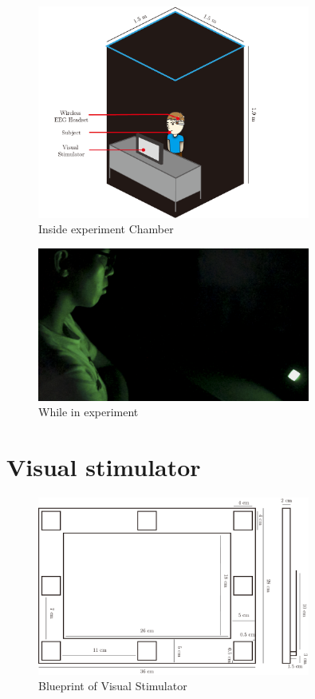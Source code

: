\begin{figure}[ht]
	\centering
	\includegraphics[width=0.8\textwidth]{chapter6/dark_wire_inside.pdf}
	\caption{Inside experiment Chamber}
\end{figure}

\begin{figure}[ht]
	\centering
	\includegraphics[width=0.8\textwidth]{chapter6/experi.jpg}
	\caption{While in experiment}
\end{figure}

\section{Visual stimulator}


\begin{figure}[ht]
	\centering
	\includegraphics[width=0.8\textwidth]{chapter6/blueprint.pdf}
	\caption{Blueprint of Visual Stimulator}
\end{figure}

